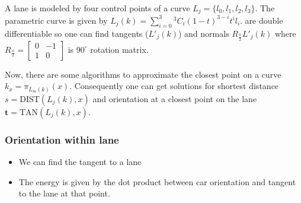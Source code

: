 \documentclass[10pt,twocolumn,letterpaper]{article}
\begin{document}
A lane is modeled by four control points of a \Beizer curve $L_j = \{l_0, l_1,
l_2, l_3\}$. The parametric curve is given by $L_j(k) = \sum_{i=0}^3 {}^3C_i
(1-t)^{3-i}t^i l_i$. \Beizer are double differentiable so one can find
tangents ($L'_j(k)$) and normals $R_{\frac{\pi}{2}}L'_j(k)$ where 
$R_{\frac{\pi}{2}} = \begin{bmatrix} 0 & -1 \\ 1 & 0 \end{bmatrix}$ is
$90^\circ$ rotation matrix.

\newcommand{\projOnLane}[1]{\pi_{L_m(k)}(#1)}
Now, there are some algorithms \cite{ma2003point, chen2007improved} to
approximate the closest point on a \Beizer curve $k_x = \projOnLane{x}$.
Consequently one can get solutions for shortest distance $s =
\text{DIST}(L_j(k), x)$ and orientation at a closest point on the lane
$\mathbf{t} = \text{TAN}(L_j(k), x)$.

%
%



\subsubsection{Orientation within lane}
\begin{itemize}
  \item We can find the tangent to a lane
  \item The energy is given by the dot product between car orientation
    and tangent to the lane at that point.
\end{itemize}

% 
% 
% 
\end{document}
